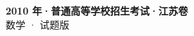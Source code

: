 \documentclass[zihao=-4, a4paper]{ctexart}
\begin{document}
\begin{center}
  {\Large\bfseries 2010 年·普通高等学校招生考试·江苏卷}\\[4pt]
  {\large 数学 · 试题版}
\end{center}
\medskip
{}

\end{document}
